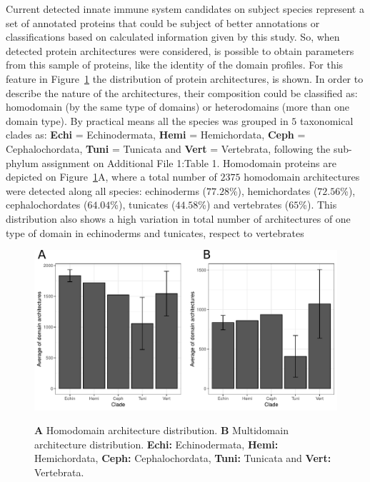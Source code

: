 \documentclass[11pt]{article}
\begin{document}
Current detected innate immune system candidates on subject species represent
a set of annotated proteins that could be subject of better annotations or
classifications based on calculated information given by this study. So, 
when detected protein architectures were considered, is possible to obtain 
parameters from this sample of proteins, like the identity of the domain profiles. 
For this feature in Figure~\ref{fig:domainDistr} the distribution of protein architectures, 
is shown. In order to describe the nature of the architectures, their composition could be
classified as: homodomain (by the same type of domains) or  heterodomains (more than one 
domain type). By practical means all the species was grouped in $5$ taxonomical clades as:
\textbf{Echi} = Echinodermata, \textbf{Hemi} = Hemichordata, \textbf{Ceph} = Cephalochordata, 
\textbf{Tuni} = Tunicata and \textbf{Vert} = Vertebrata, following the sub-phylum 
assignment on Additional File 1:Table 1. Homodomain proteins are depicted on 
Figure~\ref{fig:domainDistr}A, where a total number of $2375$ homodomain architectures 
were detected along all species: echinoderms ($77.28$\%), hemichordates ($72.56$\%), 
cephalochordates ($64.04$\%), tunicates ($44.58$\%) and vertebrates ($65$\%). 
This distribution also shows a high variation in total number of architectures of 
one type of domain in echinoderms and tunicates, respect to vertebrates 

\begin{figure}[ht!]
\centering
\includegraphics[scale=0.53]{figures/completeDistributionDomains} \\
\caption{\textbf{A} Homodomain architecture distribution. 
	\textbf{B} Multidomain architecture distribution. \textbf{Echi:} 
	Echinodermata, \textbf{Hemi:} Hemichordata, \textbf{Ceph:} Cephalochordata, 
	\textbf{Tuni:} Tunicata and \textbf{Vert:} Vertebrata.
}\label{fig:domainDistr}
\end{figure}
\end{document}
